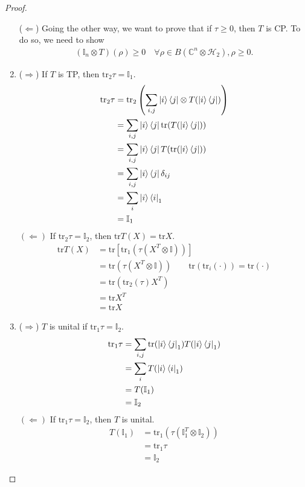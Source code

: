 \documentclass[../../note.tex]{subfiles}
\begin{document}
\begin{tcolorbox}[colframe=black,breakable, colback=black!5, arc=0pt, outer arc=0pt,boxrule=0.5pt]
\begin{proof}
\begin{enumerate}
    ($\Leftarrow$) Going the other way, we want to prove that if $\tau \geq 0$, then $T$ is CP. To do so, we need to show 
    \begin{align}
     (\mathbb{I}_n\otimes T)(\rho) \geq 0 \quad \forall \rho \in B(\mathbb{C}^n \otimes \mathcal{H}_2), \rho \geq 0.
    \end{align}
    
    \item ($\Rightarrow$) If $T$ is TP, then $\text{tr}_2 \tau = \mathbb{I}_1$.
    \begin{align}
        \text{tr}_2 \tau &= \text{tr}_2\left(\sum_{i,j} \ket{i}\bra{j} \otimes T(\ket{i}\bra{j})\right)\\
        &= \sum_{i,j} \ket{i}\bra{j}  \text{tr}(T(\ket{i}\bra{j}))\\
        &=\sum_{i,j} \ket{i}\bra{j} T(\text{tr}(\ket{i}\bra{j}))\\
        &=\sum_{i,j} \ket{i}\bra{j} \delta_{ij}\\
        &=\sum_i \ket{i}\bra{i}_1 \\
        &= \mathbb{I}_1
    \end{align}
    $(\Leftarrow)$ If $\text{tr}_2 \tau = \mathbb{I}_2$, then $\text{tr}T(X)=\text{tr}X$.
    \begin{align}
        \text{tr}T(X) &= \text{tr}\left[\text{tr}_1 (\tau(X^{T}\otimes \mathbb{I}))\right]\\
        &=\text{tr}(\tau(X^T \otimes \mathbb{I})) \quad \quad \text{tr}(\text{tr}_i(\cdot))=\text{tr}(\cdot)\\
        &= \text{tr}\left(\text{tr}_2 (\tau) X^{T} \right)\\
        &=\text{tr}X^{T} \\
        &=\text{tr}X
    \end{align}
    \item ($\Rightarrow$) $T$ is unital if $\text{tr}_1 \tau =\mathbb{I}_2$.
    \begin{align}
       \text{tr}_1 \tau &= \sum_{i,j} \text{tr}(\ket{i}\bra{j}_1)T(\ket{i}\bra{j}_1) \\
        &= \sum_i T(\ket{i}\bra{i}_1)\\
        &= T(\mathbb{I}_1)\\
        &= \mathbb{I}_2
    \end{align}
    $(\Leftarrow)$ If $\text{tr}_1 \tau =\mathbb{I}_2$, then $T$ is unital.
    \begin{align}
     T(\mathbb{I}_1)&=\text{tr}_1\left(\tau(\mathbb{I}_1^T \otimes \mathbb{I}_2)\right)\\
     &= \text{tr}_1 \tau \\
     &= \mathbb{I}_2
    \end{align}
\end{enumerate}
\end{proof}
\end{tcolorbox}
\end{document}
